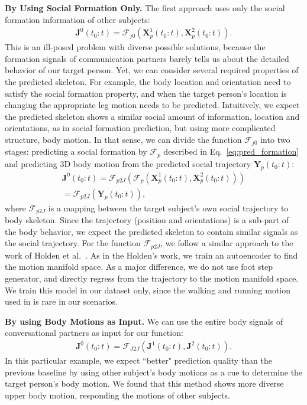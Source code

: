 \textbf{By Using Social Formation Only.} The first approach uses only the social formation information of other subjects:
\begin{gather}	
\mathbf{J}^0(t_0:t) = \mathcal{F}_{j0} ( \mathbf{X}_p^1(t_0:t), \mathbf{X}_p^2(t_0:t) ).
\end{gather}
This is an ill-posed problem with diverse possible solutions, because the formation signals of communication partners barely tells us about the detailed behavior of our target person. Yet, we can consider several required properties of the predicted skeleton. For example, the body location and orientation need to satisfy the social formation property, and when the target person's location is changing the appropriate leg motion needs to be predicted. Intuitively, we expect the predicted skeleton shows a similar social amount of information, location and orientations, as in social formation prediction, but using more complicated structure, body motion. In that sense, we can divide the function $\mathcal{F}_{j0}$ into two stages: predicting a social formation by $\mathcal{F}_p$ described in Eq.~\ref{eq:pred_formation} and predicting 3D body motion from the predicted social trajectory $\mathbf{Y}_p (t_0:t)$:
\begin{gather}	
 \mathbf{J}^0 (t_0:t) = \mathcal{F}_{p2J} \left(   \mathcal{F}_p \left( \mathbf{X}_p^1(t_0:t), \mathbf{X}_p^2(t_0:t) \right) \right) \nonumber \\ 
 = \mathcal{F}_{p2J} \left( \mathbf{Y}_p (t_0:t)  \right),
 \label{eq:pred_p2J}
\end{gather}
where $\mathcal{F}_{p2J}$ is a mapping between the target subject's own social trajectory to body skeleton. Since the trajectory (position and orientations) is a sub-part of the body behavior, we expect the predicted skeleton to contain similar signals as the social trajectory. For the function $\mathcal{F}_{p2J}$, we follow a similar approach to the work of Holden et al.~\cite{holden2016deep}. As in the Holden's work, we train an autoencoder to find the motion manifold space. As a major difference, we do not use foot step generator, and directly regress from the trajectory to the motion manifold space. We train this model in our dataset only, since the walking and running motion used in \cite{holden2016deep} is rare in our scenarios. 

\textbf{By using Body Motions as Input.} We can use the entire body signals of conversational partners as input for our function:
\begin{gather}	
\mathbf{J}^0 (t_0:t) = \mathcal{F}_{J2J} \left( \mathbf{J}^1 (t_0:t), \mathbf{J}^2 (t_0:t) \right) .
\end{gather}
In this particular example, we expect ``better" prediction quality than the previous baseline by using other subject's body motions as a cue to determine the target person's body motion. We found that this method shows more diverse upper body motion, responding the motions of other subjects. 

